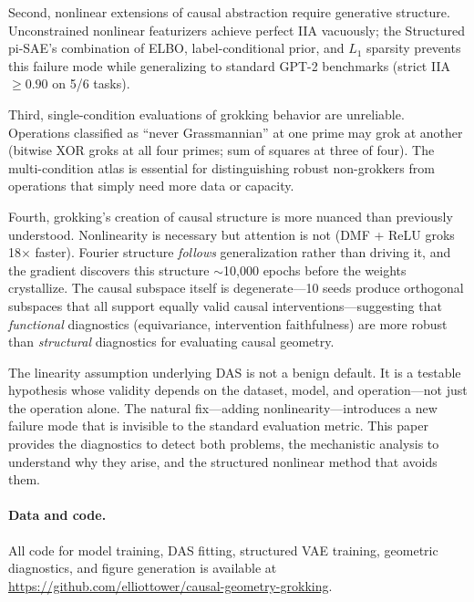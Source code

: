 \documentclass{article}
\begin{document}
Second, nonlinear extensions of causal abstraction require generative
structure. Unconstrained nonlinear featurizers achieve perfect IIA vacuously;
the Structured pi-SAE's combination of ELBO, label-conditional prior, and
$L_1$ sparsity prevents this failure mode while generalizing to standard
GPT-2 benchmarks (strict IIA $\geq 0.90$ on 5/6 tasks).

Third, single-condition evaluations of grokking behavior are unreliable.
Operations classified as ``never Grassmannian'' at one prime may grok at
another (bitwise XOR groks at all four primes; sum of squares at three of
four). The multi-condition atlas is essential for distinguishing robust
non-grokkers from operations that simply need more data or capacity.

Fourth, grokking's creation of causal structure is more nuanced than
previously understood. Nonlinearity is necessary but attention is not (DMF +
ReLU groks 18$\times$ faster). Fourier structure \emph{follows}
generalization rather than driving it, and the gradient discovers this
structure $\sim$10{,}000 epochs before the weights crystallize. The causal
subspace itself is degenerate---10 seeds produce orthogonal subspaces that
all support equally valid causal interventions---suggesting that
\emph{functional} diagnostics (equivariance, intervention faithfulness) are
more robust than \emph{structural} diagnostics for evaluating causal
geometry.

The linearity assumption underlying DAS is not a benign default. It is a
testable hypothesis whose validity depends on the dataset, model, and
operation---not just the operation alone. The natural fix---adding
nonlinearity---introduces a new failure mode that is invisible to the
standard evaluation metric. This paper provides the diagnostics to detect
both problems, the mechanistic analysis to understand why they arise, and the
structured nonlinear method that avoids them.

\paragraph{Data and code.} All code for model training, DAS fitting, structured
VAE training, geometric diagnostics, and figure generation is available at
\url{https://github.com/elliottower/causal-geometry-grokking}.

%
%



\end{document}
